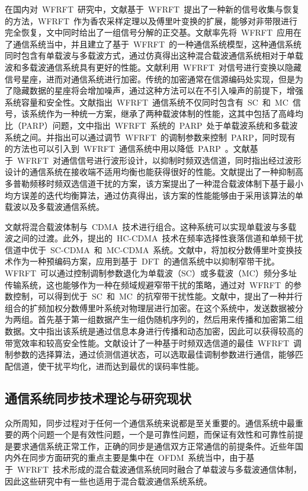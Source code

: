 在国内对~WFRFT~研究中，文献\cite{Ran2009Sampling}基于~WFRFT~提出了一种新的信号收集与恢复的方法，WFRFT~作为香农采样定理以及傅里叶变换的扩展，能够对非带限进行完全恢复，文中同时给出了一组信号分解的正交基。文献\cite{mei2010}率先将~WFRFT~应用在了通信系统当中，并且建立了基于~WFRFT~的一种通信系统模型，这种通信系统同时包含有单载波与多载波方式，通过仿真得出这种混合载波通信系统相对于单载波和多载波通信系统具有更好的性能。文献\cite{Mei2010Covert}利用~WFRFT~对信号进行变换以隐藏信号星座，进而对通信系统进行加密。传统的加密通常在信源编码处实现，但是为了隐藏数据的星座将会增加噪声，通过这种方法可以在不引入噪声的前提下，增强系统容量和安全性。文献\cite{Mei2011PAPR}指出~WFRFT~通信系统不仅同时包含有~SC~和~MC~信号，该系统作为一种统一方案，继承了两种载波体制的性能，这其中包括了高峰均比（PARP）问题，文中指出~WFRFT~系统的~PARP~处于单载波系统和多载波系统之间。并指出可以通过调节~WFRFT~的调制参数来控制~PARP，同时现有的方法也可以引入到~WFRFT~通信系统中用以降低~PARP~。文献\cite{Wu2011Wavefrom}基于~WFRFT~对通信信号进行波形设计，以抑制时频双选信道，同时指出经过波形设计的通信系统在接收端不适用均衡也能获得很好的性能。文献\cite{Wang2012On}提出了一种抑制高多普勒频移时频双选信道干扰的方案，该方案提出了一种混合载波体制下基于最小均方误差的迭代均衡算法，通过仿真得出，该方案的性能能够由于采用该算法的单载波以及多载波通信系统。

文献\cite{sha2012_432_435}将混合载波体制与~CDMA~技术进行组合。这种系统可以实现单载波与多载波之间的过渡。此外，提出的~HC-CDMA~技术在频率选择性衰落信道和单频干扰信道中优于~SC-CDMA~和~MC-CDMA~系统。文献\cite{mei2013_1916_1919}中，将加权分数傅里叶变换技术作为一种预编码方案，应用到基于~DFT~的通信系统中以抑制窄带干扰。WFRFT~可以通过控制调制参数退化为单载波（SC）或多载波（MC）频分多址传输系统，这也能够作为一种在频域规避窄带干扰的策略，通过对~WFRFT~的参数控制，可以得到优于~SC~和~MC~的抗窄带干扰性能。文献\cite{Xiaojie2015Secret}中，提出了一种并行组合的扩频加权分数傅里叶系统对物理层进行加密。在这个系统中，发送数据被分为两组。首先基于第一组数据产生一组伪随机序列的，然后用来传播和加密第二组数据。文中指出该系统是通过信息本身进行传播和动态加密，因此可以获得较高的带宽效率和较高安全性能。文献\cite{hui2015_177_179}设计了一种基于时频双选信道的最佳~WFRFT~调制参数的选择算法，通过侦测信道状态，可以选取最佳调制参数进行通信，能够匹配信道，使干扰平均化，进而达到最优的误码率性能。

\subsection{通信系统同步技术理论与研究现状}
众所周知，同步过程对于任何一个通信系统来说都是至关重要的。通信系统中最重要的两个问题一个是有效性问题，一个是可靠性问题，而保证有效性和可靠性前提是要求通信系统正常工作，正确的同步是通信双方正常通信的前提条件。近些年国内外在同步方面研究的重点主要是集中在~OFDM~系统当中，由于基于~WFRFT~技术形成的混合载波通信系统同时融合了单载波与多载波通信体制，因此这些研究中有一些也适用于混合载波通信系统系统。

